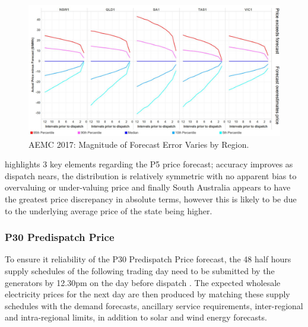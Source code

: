 \begin{figure}[!htb]
\centering
\includegraphics[width=1\textwidth]{Pictures/Chapter2/AEMC_P5_Error.PNG}
\caption{AEMC 2017: Magnitude of Forecast Error Varies by Region.}
\label{fig:p5_aemc}
\end{figure}
\parencite{AEMCMarch2017} highlights 3 key elements regarding the P5 price forecast; accuracy improves as dispatch nears, the distribution is relatively symmetric with no apparent bias to overvaluing or under-valuing price and finally South Australia appears to have the greatest price discrepancy in absolute terms, however this is likely to be due to the underlying average price of the state being higher.


\subsubsection{P30 Predispatch Price}

To ensure it reliability of the P30 Predispatch Price forecast, the 48 half hours supply schedules of the following trading day need to be submitted by the generators by 12.30pm on the day before dispatch \parencite{Predispatch}. The expected wholesale electricity prices for the next day are then produced by matching these supply schedules with the demand forecasts, ancillary service requirements, inter-regional and intra-regional limits, in addition to solar and wind energy forecasts. 

\caption{AEMO Pre-dispatch Process.}
\label{diagram:predispatch_process}


